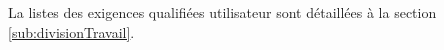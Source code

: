 La listes des exigences qualifiées utilisateur sont détaillées à la section \ref{sub:divisionTravail}.